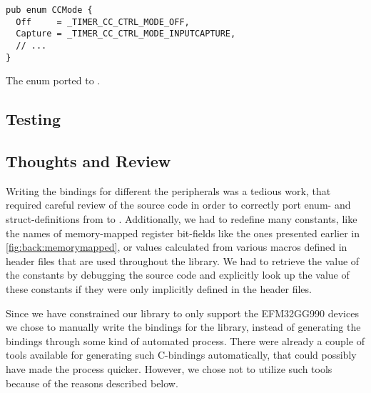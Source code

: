 \begin{listing}[h]
\begin{verbatim}
pub enum CCMode {
  Off     = _TIMER_CC_CTRL_MODE_OFF,
  Capture = _TIMER_CC_CTRL_MODE_INPUTCAPTURE,
  // ...
}
\end{verbatim}
\caption{The enum ported to {\rust}.}
\label{lst:enum_naming_rust}
\end{listing}

\subsection{Testing}
\label{ssub:testing}


\subsection{Thoughts and Review}


Writing the bindings for different the peripherals was a tedious work, that required careful review of the \emlib source code in order to correctly port enum- and struct-definitions from \C to {\rust}.
Additionally, we had to redefine many constants, like the names of memory-mapped register bit-fields like the ones presented earlier in \autoref{fig:back:memorymapped}, or values calculated from various \C macros defined in header files that are used throughout the library.
We had to retrieve the value of the constants by debugging the source code and explicitly look up the value of these constants if they were only implicitly defined in the header files.

Since we have constrained our library to only support the EFM32GG990 devices we chose to manually write the bindings for the library, instead of generating the bindings through some kind of automated process.
There were already a couple of tools available for generating such C-bindings automatically, that could possibly have made the process quicker.
However, we chose not to utilize such tools because of the reasons described below.

